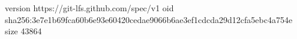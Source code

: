 version https://git-lfs.github.com/spec/v1
oid sha256:3e7e1b69fca60b6e93e60420cedae9066b6ae3ef1cdcda29d12cfa5ebc4a754e
size 43864
